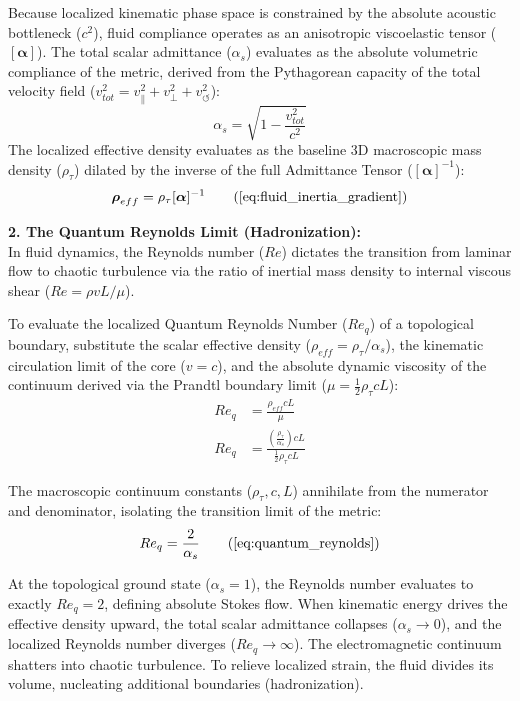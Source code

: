\documentclass[11pt, a4paper]{article}
\begin{document}
Because localized kinematic phase space is constrained by the absolute acoustic bottleneck ($c^2$), fluid compliance operates as an anisotropic viscoelastic tensor ($[\boldsymbol{\alpha}]$). The total scalar admittance ($\alpha_s$) evaluates as the absolute volumetric compliance of the metric, derived   from the Pythagorean capacity of the total velocity field ($v_{tot}^2 = v_{\parallel}^2 + v_{\perp}^2 + v_{\circlearrowleft}^2$):
\begin{equation}
    \alpha_s = \sqrt{1 - \frac{v_{tot}^2}{c^2}} \nonumber
\end{equation}
The localized effective density evaluates as the baseline 3D macroscopic mass density ($\rho_{\tau}$) dilated by the inverse of the full Admittance Tensor ($[\boldsymbol{\alpha}]^{-1}$):
\begin{equation}
    \boldsymbol{\rho}_{eff} = \rho_{\tau} [\boldsymbol{\alpha}]^{-1} \tag{\ref{eq:fluid_inertia_gradient}}
\end{equation}

\textbf{2. The Quantum Reynolds Limit (Hadronization):} \\
In fluid dynamics, the Reynolds number ($Re$) dictates the transition from laminar flow to chaotic turbulence via the ratio of inertial mass density to internal viscous shear ($Re = \rho v L / \mu$). 

To evaluate the localized Quantum Reynolds Number ($Re_q$) of a topological boundary, substitute the scalar effective density ($\rho_{eff} = \rho_{\tau}/\alpha_s$), the kinematic circulation limit of the core ($v = c$), and the absolute dynamic viscosity of the continuum derived via the Prandtl boundary limit ($\mu = \frac{1}{2} \rho_{\tau} c L$):
\begin{align}
    Re_q &= \frac{\rho_{eff} c L}{\mu} \nonumber \\
    Re_q &= \frac{\left( \frac{\rho_{\tau}}{\alpha_s} \right) c L}{\frac{1}{2} \rho_{\tau} c L} \nonumber
\end{align}

The macroscopic continuum constants ($\rho_{\tau}, c, L$) annihilate from the numerator and denominator, isolating the transition limit of the metric:
\begin{equation}
    Re_q = \frac{2}{\alpha_s} \tag{\ref{eq:quantum_reynolds}}
\end{equation}

At the topological ground state ($\alpha_s = 1$), the Reynolds number evaluates to exactly $Re_q = 2$, defining absolute Stokes flow. When kinematic energy drives the effective density upward, the total scalar admittance collapses ($\alpha_s \to 0$), and the localized Reynolds number diverges ($Re_q \to \infty$). The electromagnetic continuum shatters into chaotic turbulence. To relieve localized strain, the fluid divides its volume, nucleating additional boundaries (hadronization).
\end{document}
